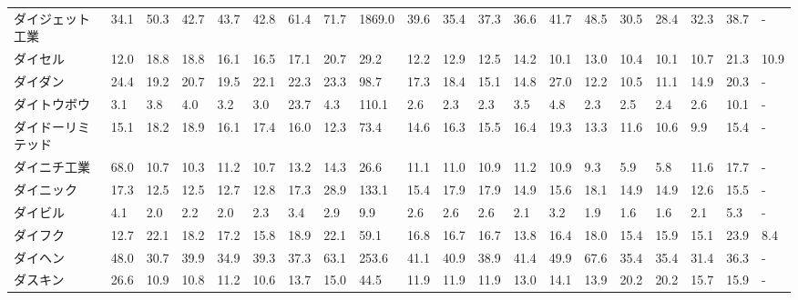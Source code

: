 \begin{longtable}[c]{lp{3mm}p{3mm}p{3mm}p{3mm}p{3mm}p{3mm}p{3mm}p{3mm}p{3mm}p{3mm}p{3mm}p{3mm}p{3mm}p{3mm}p{3mm}p{3mm}p{3mm}p{3mm}p{3mm}}
ダイジェット工業        &   34.1 &   50.3 &      42.7 &      43.7 &       42.8 &    61.4 &    71.7 &   1869.0 &    39.6 &    35.4 &   37.3 &   36.6 &    41.7 &    48.5 &    30.5 &   28.4 &   32.3 &    38.7 &      - \\
ダイセル            &   12.0 &   18.8 &      18.8 &      16.1 &       16.5 &    17.1 &    20.7 &     29.2 &    12.2 &    12.9 &   12.5 &   14.2 &    10.1 &    13.0 &    10.4 &   10.1 &   10.7 &    21.3 &   10.9 \\
ダイダン            &   24.4 &   19.2 &      20.7 &      19.5 &       22.1 &    22.3 &    23.3 &     98.7 &    17.3 &    18.4 &   15.1 &   14.8 &    27.0 &    12.2 &    10.5 &   11.1 &   14.9 &    20.3 &      - \\
ダイトウボウ          &    3.1 &    3.8 &       4.0 &       3.2 &        3.0 &    23.7 &     4.3 &    110.1 &     2.6 &     2.3 &    2.3 &    3.5 &     4.8 &     2.3 &     2.5 &    2.4 &    2.6 &    10.1 &      - \\
ダイドーリミテッド       &   15.1 &   18.2 &      18.9 &      16.1 &       17.4 &    16.0 &    12.3 &     73.4 &    14.6 &    16.3 &   15.5 &   16.4 &    19.3 &    13.3 &    11.6 &   10.6 &    9.9 &    15.4 &      - \\
ダイニチ工業          &   68.0 &   10.7 &      10.3 &      11.2 &       10.7 &    13.2 &    14.3 &     26.6 &    11.1 &    11.0 &   10.9 &   11.2 &    10.9 &     9.3 &     5.9 &    5.8 &   11.6 &    17.7 &      - \\
ダイニック           &   17.3 &   12.5 &      12.5 &      12.7 &       12.8 &    17.3 &    28.9 &    133.1 &    15.4 &    17.9 &   17.9 &   14.9 &    15.6 &    18.1 &    14.9 &   14.9 &   12.6 &    15.5 &      - \\
ダイビル            &    4.1 &    2.0 &       2.2 &       2.0 &        2.3 &     3.4 &     2.9 &      9.9 &     2.6 &     2.6 &    2.6 &    2.1 &     3.2 &     1.9 &     1.6 &    1.6 &    2.1 &     5.3 &      - \\
ダイフク            &   12.7 &   22.1 &      18.2 &      17.2 &       15.8 &    18.9 &    22.1 &     59.1 &    16.8 &    16.7 &   16.7 &   13.8 &    16.4 &    18.0 &    15.4 &   15.9 &   15.1 &    23.9 &    8.4 \\
ダイヘン            &   48.0 &   30.7 &      39.9 &      34.9 &       39.3 &    37.3 &    63.1 &    253.6 &    41.1 &    40.9 &   38.9 &   41.4 &    49.9 &    67.6 &    35.4 &   35.4 &   31.4 &    36.3 &      - \\
ダスキン            &   26.6 &   10.9 &      10.8 &      11.2 &       10.6 &    13.7 &    15.0 &     44.5 &    11.9 &    11.9 &   11.9 &   13.0 &    14.1 &    13.9 &    20.2 &   20.2 &   15.7 &    15.9 &      - \\

\end{longtable}
